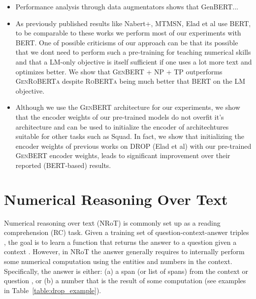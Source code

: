\documentclass[11pt,a4paper]{article}
\newcommand\bert{\textsc{BERT}}
\newcommand\roberta{\textsc{RoBERTa}}
\newcommand\genbert{\textsc{GenBERT}}
\newcommand\genroberta{\textsc{GenRoBERTa}}
\begin{document}
{\begin{itemize}
    \item Performance analysis through data augmentators shows that GenBERT...
    
    \item As previously published results like Nabert+, MTMSN, Elad et al use \bert{}, to be comparable to these works we perform most of our experiments with \bert{}. One of possible criticisms of our approach can be that its possible that we dont need to perform such a pre-training for teaching numerical skills and that a LM-only objective is itself sufficient if one uses a lot more text and optimizes better. We show that \genbert{} + NP + TP outperforms \genroberta{} despite \roberta{} being much better that \bert{} on the LM objective.
    
    \item Although we use the \genbert{} architecture for our experiments, we show that the encoder weights of our pre-trained models do not overfit it's architecture and can be used to initialize the encoder of architechtures suitable for other tasks such as Squad. In fact, we show that initializing the encoder weights of previous works on DROP (Elad et al) with our pre-trained \genbert{} encoder weights, leads to significant improvement over their reported (\bert{}-based) results.
    
\end{itemize}
}


 \section{Numerical Reasoning Over Text}
\label{sec:background}


Numerical reasoning over text (NRoT) is commonly set up as a reading
comprehension (RC) task. Given a training set of question-context-answer triples
, the goal is to learn a function
that returns the answer  to a  question  given a context
. However, in NRoT the answer generally requires to internally perform
some numerical computation using the entities and numbers in the context.
Specifically, the answer is either: (a) a span (or list of spans) from the
context  or question , or (b) a number that is the result of some computation (see examples in Table~\ref{table:drop_example}).
\end{document}
